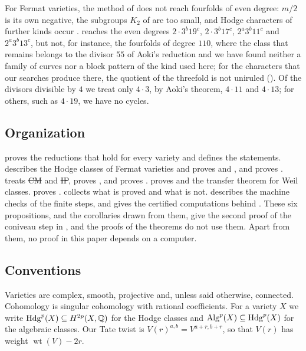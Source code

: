 For Fermat varieties, the method of  does not reach
fourfolds of even degree: $m/2$ is its own negative, the subgroups $K_{2}$
of  are too small, and Hodge characters of further
kinds occur \cite{Aok83}.  reaches the even degrees
$2\cdot3^{b}19^{c}$, $2\cdot3^{b}17^{c}$, $2^{a}3^{b}11^{c}$ and
$2^{a}3^{b}13^{c}$, but not, for instance, the fourfolds of degree $110$,
where the class that remains belongs to the divisor $55$ of Aoki's reduction
and we have found neither a family of curves nor a block pattern of the kind
used here; for the characters that our searches produce there, the quotient
of the threefold is not uniruled (). Of the
divisors divisible by $4$ we treat only $4\cdot3$, by Aoki's theorem,
$4\cdot11$ and $4\cdot13$; for others, such as $4\cdot19$, we have no
cycles.

\subsection*{Organization}
 proves the reductions that hold for every variety and
defines the statements.  describes the Hodge classes of
Fermat varieties and proves  and , and
 proves .
 treats \st{CM} and \st{IP}, proves , and
proves .  proves  and the transfer
theorem for Weil classes.  proves .
 collects what is proved and what is not.
 describes the machine checks of the finite steps, and
 gives the certified computations behind
.
These six propositions, and the corollaries drawn from them, give the
second proof of the coniveau step in , and the proofs of
the theorems do not use them. Apart from them, no proof in this paper
depends on a computer.

\subsection*{Conventions}
Varieties are complex, smooth, projective and, unless said otherwise,
connected. Cohomology is singular cohomology with rational coefficients.
For a variety $X$ we write $\operatorname{Hdg}^{p}(X)\subseteq H^{2p}(X,\mathbb{Q})$ for the Hodge
classes and $\operatorname{Alg}^{p}(X)\subseteq\operatorname{Hdg}^{p}(X)$ for the algebraic classes. Our
Tate twist is $V(r)^{a,b}=V^{a+r,b+r}$, so that $V(r)$ has weight
$\operatorname{wt}(V)-2r$.
